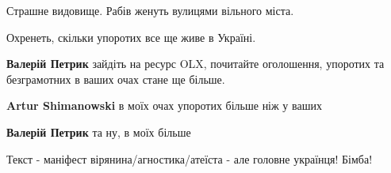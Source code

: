 \begin{itemize}
Страшне видовище. Рабів женуть вулицями вільного міста.

 
Охренеть, скільки упоротих все ще живе в Україні.

\begin{itemize}
 
\textbf{Валерій Петрик} зайдіть на ресурс OLX, почитайте оголошення, упоротих та безграмотних в ваших очах стане ще більше.

 
\textbf{Artur Shimanowski} в моїх очах упоротих більше ніж у ваших

 
\textbf{Валерій Петрик} та ну, в моїх більше \Smiley[1.0][yellow]

\end{itemize}

 
Текст - маніфест вірянина/агностика/атеїста - але головне українця! Бімба!

\begin{itemize}
 

\end{itemize}
\end{itemize}

